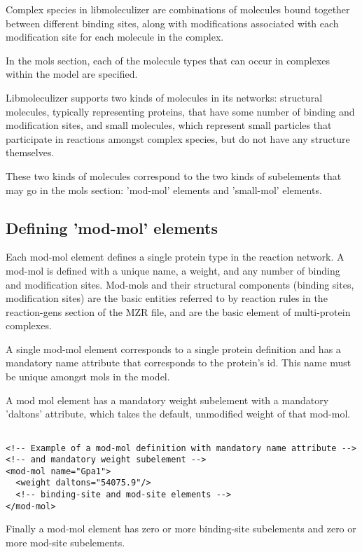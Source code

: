 Complex species in libmoleculizer are combinations of molecules bound
together between different binding sites, along with modifications
associated with each modification site for each molecule in the complex.  

In the mols section, each of the molecule types that can occur in
complexes within the model are specified.

Libmoleculizer supports two kinds of molecules in its networks:
structural molecules, typically representing proteins, that have some
number of binding and modification sites, and small molecules, which
represent small particles that participate in reactions amongst
complex species, but do not have any structure themselves.

These two kinds of molecules correspond to the two kinds of
subelements that may go in the mols section: 'mod-mol' elements and
'small-mol' elements.   

\subsection{Defining 'mod-mol' elements}
Each mod-mol element defines a single protein type in the reaction 
network.  A mod-mol is defined with a unique name, a weight, and any number
of binding and modification sites. Mod-mols and their structural
components (binding sites, modification sites) are the basic entities 
referred to by reaction rules in the reaction-gens section of the MZR
file, and are the basic element of multi-protein complexes.

A single mod-mol element corresponds to a single protein definition
and has a mandatory name attribute that corresponds to the protein's
id.  This name must be unique amongst mols in the model.  

A mod mol element has a mandatory weight subelement with a mandatory
'daltons' attribute, which takes the default, unmodified weight of
that mod-mol.

\lstset{language=XML}
\begin{lstlisting}[caption=Basic mod-mol structure, label=basicmodmolstructure ]

<!-- Example of a mod-mol definition with mandatory name attribute -->
<!-- and mandatory weight subelement -->
<mod-mol name="Gpa1">
  <weight daltons="54075.9"/>
  <!-- binding-site and mod-site elements -->
</mod-mol>

\end{lstlisting}

Finally a mod-mol element has zero or more binding-site subelements
and zero or more mod-site subelements.  

